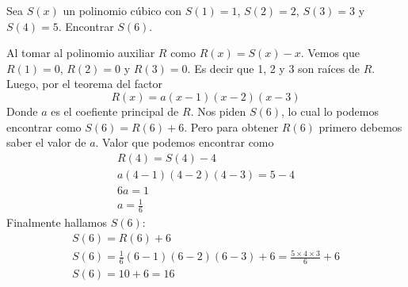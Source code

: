         \begin{section-problem}
            Sea $S(x)$ un polinomio cúbico con $S(1) = 1$, $S(2) = 2$, $S(3) = 3$ y $S(4) = 5$.
            Encontrar $S(6)$.

            \begin{solution}[1]
                Al tomar al polinomio auxiliar $R$ como $R(x) = S(x) - x$. Vemos que $R(1) = 0$, $R(2) = 0$ y $R(3) = 0$.
                Es decir que 1, 2 y 3 son raíces de $R$. Luego, por el teorema del factor
                \[R(x) = a(x - 1)(x - 2)(x - 3)\]
                Donde $a$ es el coefiente principal de $R$. Nos piden $S(6)$, lo cual lo podemos encontrar como $S(6) = R(6) + 6$.
                Pero para obtener $R(6)$ primero debemos saber el valor de $a$. Valor que podemos encontrar como
                \begin{gather*}
                    R(4) = S(4) - 4\\
                    a(4 - 1)(4 - 2)(4 - 3) = 5 - 4\\
                    6a = 1\\
                    a = \frac{1}{6}
                \end{gather*}
                Finalmente hallamos $S(6)$:
                \begin{gather*}
                    S(6) = R(6) + 6\\
                    S(6) = \frac{1}{6} (6 - 1)(6 - 2)(6 - 3) + 6 = \frac{5\times 4 \times 3}{6} + 6 \\
                    S(6) = 10 + 6 = \boxed{16}
                \end{gather*}
            \end{solution}


\end{section-problem}

